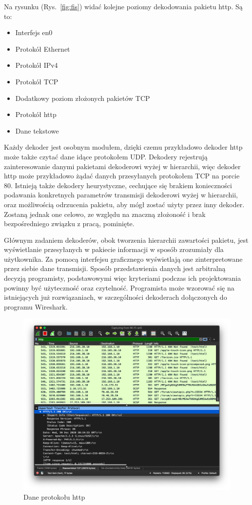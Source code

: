 \documentclass[a4paper, 12pt, twoside, openright]{article}
\begin{document}
	Na rysunku (Rys.~\ref{fig:fis}) widać kolejne poziomy dekodowania pakietu http. Są to:

	\begin{itemize}
		\item Interfejs en0
		\item Protokół Ethernet
		\item Protokół IPv4
		\item Protokół TCP
		\item Dodatkowy poziom złożonych pakietów TCP
		\item Protokół http
		\item Dane tekstowe
	\end{itemize}

	Każdy dekoder jest osobnym modułem, dzięki czemu przykładowo dekoder http może także czytać dane idące protokołem UDP.
	Dekodery rejestrują zainteresowanie danymi pakietami dekoderowi wyżej w hierarchii, więc dekoder http może przykładowo
	żądać danych przesyłanych protokołem TCP na porcie 80. Istnieją także dekodery heurystyczne, cechujące się brakiem
	konieczności podawania konkretnych parametrów transmisji dekoderowi wyżej w hierarchii, oraz możliwością odrzucenia pakietu,
	aby mógł zostać użyty przez inny dekoder. Zostaną jednak one celowo, ze względu na znaczną złożoność i brak bezpośredniego
	związku z pracą, pominięte.

	Głównym zadaniem dekoderów, obok tworzenia hierarchii zawartości pakietu, jest wyświetlanie przesyłanych w pakiecie informacji w sposób zrozumiały dla użytkownika.
	Za pomocą interfejsu graficznego wyświetlają one zinterpretowane przez siebie dane transmisji. Sposób przedstawienia danych
	jest arbitralną decyzją programisty, podstawowymi więc kryteriami podczas ich projektowania powinny być użyteczność oraz czytelność.
	Programista może wzorować się na istniejących już rozwiązaniach, w szczególności dekoderach dołączonych do programu Wireshark.

	\begin{figure}[h]
		\centering
			\includegraphics[width=1.0\textwidth]{img/screenshot_fis_http.png}
		\caption{Dane protokołu http}
		\label{fig:fis_http}
	\end{figure}
\end{document}
